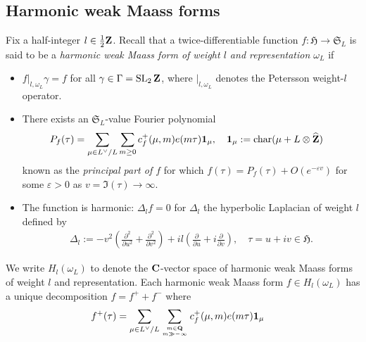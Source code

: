 \documentclass{amsart}
\theoremstyle{definition}
\theoremstyle{definition}
\theoremstyle{definition}
\begin{document}
\subsection{Harmonic weak Maass forms}

Fix a half-integer $l \in \frac{1}{2}{\bf{Z}}$. Recall that a twice-differentiable function $f: \mathfrak{H} \longrightarrow \mathfrak{S}_L$ 
is said to be a {\it{harmonic weak Maass form of weight $l$ and representation $\omega_L$}} if

\begin{itemize}

\item[(i)] $f\vert_{l, \omega_L} \gamma = f$ for all $\gamma \in \Gamma = \operatorname{SL}_2{\bf{Z}}$, where $\vert_{l, \omega_L}$
denotes the Petersson weight-$l$ operator. \\

\item[(ii)] There exists an $\mathfrak{S}_L$-value Fourier polynomial
\begin{align*} P_f(\tau) &= \sum\limits_{\mu \in L^{\vee}/L} \sum\limits_{m \geq 0} c_f^+(\mu, m) e(m \tau) {\bf{1}}_{\mu},
\quad {\bf{1}}_{\mu} := \operatorname{char}(\mu + L \otimes \widehat{{\bf{Z}}}) \end{align*}
known as the {\it{principal part of $f$}} for which $f(\tau) = P_f(\tau) + O(e^{-\varepsilon v})$ for some $\varepsilon >0$ as $v = \Im(\tau) \rightarrow \infty$. \\

\item[(iii)] The function is harmonic: $\Delta_l f =0$ for $\Delta_l$ the hyperbolic Laplacian of weight $l$ defined by 
\begin{align*} \Delta_l := -v^2 \left( \frac{\partial^2}{ \partial u^2 } + \frac{ \partial^2 }{ \partial v^2 }\right) 
+ i l \left( \frac{\partial}{\partial u} + i \frac{\partial}{\partial v}\right), \quad \tau = u + iv \in \mathfrak{H}. \end{align*}

\end{itemize} We write $H_l(\omega_L)$ to denote the ${\bf{C}}$-vector space of harmonic weak Maass forms of weight $l$ and representation. 
Each harmonic weak Maass form $f \in H_l(\omega_L)$ has a unique decomposition $f = f^+ + f^-$ where 
\begin{align*} f^+(\tau) &= \sum\limits_{\mu \in  L^{\vee}/L} \sum\limits_{m \in {\bf{Q}} \atop m \gg - \infty} c_f^+(\mu, m) e(m \tau) {\bf{1}}_{\mu} \end{align*}
\end{document}
